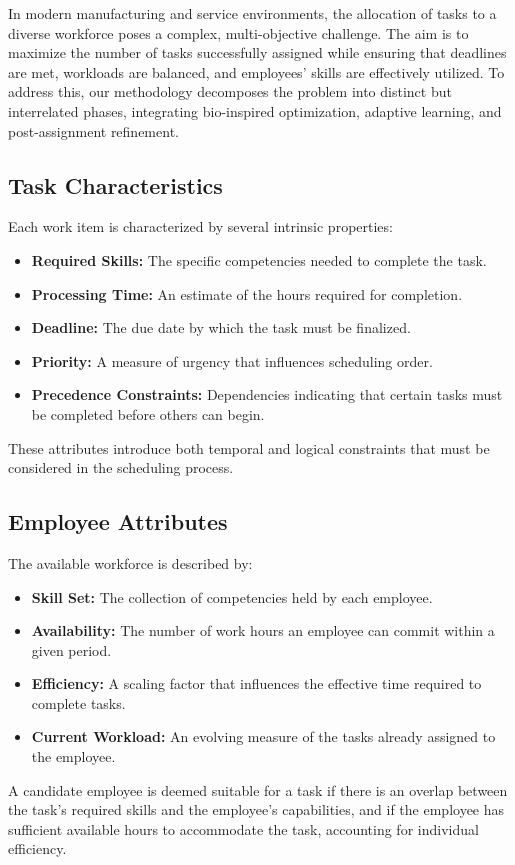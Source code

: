 \documentclass[conference]{IEEEtran}
\begin{document}
	In modern manufacturing and service environments, the allocation of tasks to a
	diverse workforce poses a complex, multi-objective challenge. The aim is to
	maximize the number of tasks successfully assigned while ensuring that
	deadlines are met, workloads are balanced, and employees’ skills are
	effectively utilized. To address this, our methodology decomposes the problem
	into distinct but interrelated phases, integrating bio-inspired optimization,
	adaptive learning, and post-assignment refinement.

	\subsection{Task Characteristics}

	Each work item is characterized by several intrinsic properties:
	\begin{itemize}
		\item \textbf{Required Skills:} The specific competencies needed to complete
			the task.

		\item \textbf{Processing Time:} An estimate of the hours required for
			completion.

		\item \textbf{Deadline:} The due date by which the task must be finalized.

		\item \textbf{Priority:} A measure of urgency that influences scheduling
			order.

		\item \textbf{Precedence Constraints:} Dependencies indicating that certain
			tasks must be completed before others can begin.
	\end{itemize}
	These attributes introduce both temporal and logical constraints that must be considered
	in the scheduling process.

	\subsection{Employee Attributes}

	The available workforce is described by:
	\begin{itemize}
		\item \textbf{Skill Set:} The collection of competencies held by each
			employee.

		\item \textbf{Availability:} The number of work hours an employee can commit
			within a given period.

		\item \textbf{Efficiency:} A scaling factor that influences the effective
			time required to complete tasks.

		\item \textbf{Current Workload:} An evolving measure of the tasks already
			assigned to the employee.
	\end{itemize}
	A candidate employee is deemed suitable for a task if there is an overlap between
	the task’s required skills and the employee’s capabilities, and if the
	employee has sufficient available hours to accommodate the task, accounting for
	individual efficiency.
\end{document}
